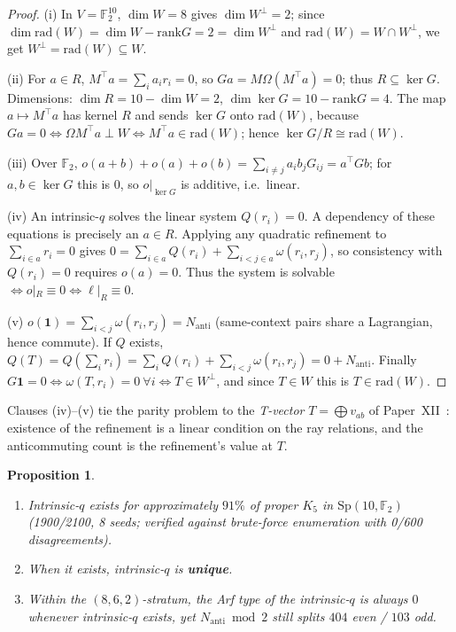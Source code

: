 \documentclass[11pt,a4paper]{article}
\newtheorem{proposition}[theorem]{Proposition}
\theoremstyle{remark}
\newcommand{\Sp}{\mathrm{Sp}}
\newcommand{\rad}{\mathrm{rad}}
\newcommand{\rank}{\mathrm{rank}}
\newcommand{\Nanti}{N_{\mathrm{anti}}}
\begin{document}
\begin{proof}
(i) In $V=\mathbb F_2^{10}$, $\dim W=8$ gives $\dim W^{\perp}=2$; since
$\dim\rad(W)=\dim W-\rank G=2=\dim W^{\perp}$ and $\rad(W)=W\cap W^{\perp}$, we get
$W^{\perp}=\rad(W)\subseteq W$.

(ii) For $a\in R$, $M^{\top}a=\sum_i a_i r_i=0$, so $Ga=M\Omega(M^{\top}a)=0$;
thus $R\subseteq\ker G$. Dimensions: $\dim R=10-\dim W=2$,
$\dim\ker G=10-\rank G=4$. The map $a\mapsto M^{\top}a$ has kernel $R$ and sends
$\ker G$ onto $\rad(W)$, because $Ga=0\iff\Omega M^{\top}a\perp W\iff
M^{\top}a\in\rad(W)$; hence $\ker G/R\cong\rad(W)$.

(iii) Over $\mathbb F_2$, $o(a+b)+o(a)+o(b)=\sum_{i\ne j}a_i b_j G_{ij}=a^{\top}Gb$;
for $a,b\in\ker G$ this is $0$, so $o|_{\ker G}$ is additive, i.e.\ linear.

(iv) An intrinsic-$q$ solves the linear system $Q(r_i)=0$. A dependency of these
equations is precisely an $a\in R$. Applying any quadratic refinement to
$\sum_{i\in a}r_i=0$ gives $0=\sum_{i\in a}Q(r_i)+\sum_{i<j\in a}\omega(r_i,r_j)$,
so consistency with $Q(r_i)=0$ requires $o(a)=0$. Thus the system is solvable
$\iff o|_R\equiv0\iff\ell|_R\equiv0$.

(v) $o(\mathbf 1)=\sum_{i<j}\omega(r_i,r_j)=\Nanti$ (same-context pairs share a
Lagrangian, hence commute). If $Q$ exists,
$Q(T)=Q(\sum_i r_i)=\sum_i Q(r_i)+\sum_{i<j}\omega(r_i,r_j)=0+\Nanti$. Finally
$G\mathbf 1=0\iff\omega(T,r_i)=0\ \forall i\iff T\in W^{\perp}$, and since
$T\in W$ this is $T\in\rad(W)$.
\end{proof}

\noindent
Clauses (iv)--(v) tie the parity problem to the \emph{T-vector} $T=\bigoplus
v_{ab}$ of Paper~XII~\cite{PaperXII}: existence of the refinement is a linear
condition on the ray relations, and the anticommuting count is the refinement's
value at $T$.

\begin{proposition}\label{prop:intrinsicq}
\begin{enumerate}
\item Intrinsic-$q$ exists for approximately $91\%$ of proper $K_5$ in $\Sp(10,\mathbb F_2)$
  (1900/2100, 8 seeds; verified against brute-force enumeration with 0/600 disagreements).
\item When it exists, intrinsic-$q$ is \textbf{unique}.
\item Within the $(8,6,2)$-stratum, the Arf type of the intrinsic-$q$ is always $0$
  whenever intrinsic-$q$ exists, yet $\Nanti\bmod2$ still splits $404$ even / $103$ odd.
\end{enumerate}
\end{proposition}
\end{document}

